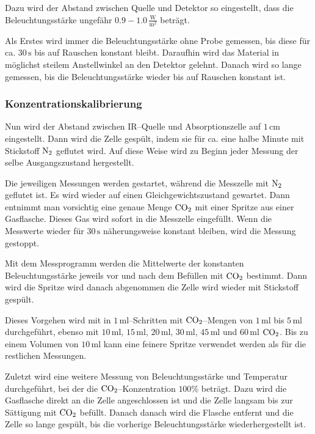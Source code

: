 \documentclass[12pt,a4paper]{scrartcl}
\numberwithin{equation}{section} %
\begin{document}
Dazu wird der Abstand zwischen Quelle und Detektor so eingestellt, dass die Beleuchtungsstärke ungefähr $0.9-1.0\mathrm{\,\frac{W}{m^2}}$ beträgt.

Als Erstes wird immer die Beleuchtungsstärke ohne Probe gemessen, bis diese für ca. $30\mathrm{\,s}$ bis auf Rauschen konstant bleibt. Daraufhin wird das Material in möglichst steilem Anstellwinkel an den Detektor gelehnt. Danach wird so lange gemessen, bis die Beleuchtungsstärke wieder bis auf Rauschen konstant ist.

\subsubsection{Konzentrationskalibrierung}
\label{howto:Konzentrationskalibrierung}
Nun wird der Abstand zwischen IR--Quelle und Absorptionszelle auf $1\mathrm{\,cm}$ eingestellt. Dann wird die Zelle gespült, indem sie für ca. eine halbe Minute mit Stickstoff $\ce{N_2}$ geflutet wird. Auf diese Weise wird zu Beginn jeder Messung der selbe Ausgangszustand hergestellt.

Die jeweiligen Messungen werden gestartet, während die Messzelle mit $\ce{N_2}$ geflutet ist. Es wird wieder auf einen Gleichgewichtszustand gewartet. Dann entnimmt man vorsichtig eine genaue Menge $\ce{CO_2}$ mit einer Spritze aus einer Gasflasche. Dieses Gas wird sofort in die Messzelle eingefüllt. Wenn die Messwerte wieder für $30\mathrm{\,s}$ näherungsweise konstant bleiben, wird die Messung gestoppt.

Mit dem Messprogramm werden die Mittelwerte der konstanten Beleuchtungsstärke jeweils vor und nach dem Befüllen mit $\ce{CO_2}$ bestimmt. Dann wird die Spritze wird danach abgenommen die Zelle wird wieder mit Stickstoff gespült.

Dieses Vorgehen wird mit in $1\mathrm{\,ml}$--Schritten mit $\ce{CO_2}$--Mengen von $1\mathrm{\,ml}$ bis $5\mathrm{\,ml}$ durchgeführt, ebenso mit $10\mathrm{\,ml}$, $15\mathrm{\,ml}$, $20\mathrm{\,ml}$, $30\mathrm{\,ml}$, $45\mathrm{\,ml}$ und $60\mathrm{\,ml}$ $\ce{CO_2}$. Bis zu einem Volumen von $10\mathrm{\,ml}$ kann eine feinere Spritze verwendet werden als für die restlichen Messungen.

Zuletzt wird eine weitere Messung von Beleuchtungsstärke und Temperatur durchgeführt, bei der die $\ce{CO_2}$--Konzentration $100\%$ beträgt. Dazu wird die  Gasflasche direkt an die Zelle angeschlossen ist und die Zelle langsam bis zur Sättigung mit $\ce{CO_2}$ befüllt. Danach danach wird die Flasche entfernt und die Zelle so lange gespült, bis die vorherige Beleuchtungsstärke wiederhergestellt ist.
\end{document}

